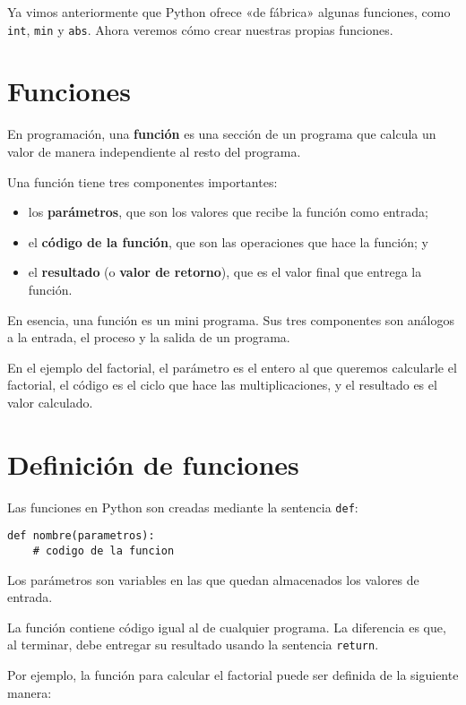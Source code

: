 Ya vimos anteriormente que Python ofrece «de fábrica» algunas funciones,
como \lstinline!int!, \lstinline!min! y \lstinline!abs!. Ahora veremos
cómo crear nuestras propias funciones.

\section{Funciones}

En programación, una \textbf{función} es una sección de un programa que
calcula un valor de manera independiente al resto del programa.

Una función tiene tres componentes importantes:

\begin{itemize}
\item
  los \textbf{parámetros}, que son los valores que recibe la función
  como entrada;
\item
  el \textbf{código de la función}, que son las operaciones que hace la
  función; y
\item
  el \textbf{resultado} (o \textbf{valor de retorno}), que es el valor
  final que entrega la función.
\end{itemize}

En esencia, una función es un mini programa. Sus tres componentes son
análogos a la entrada, el proceso y la salida de un programa.

En el ejemplo del factorial, el parámetro es el entero al que queremos
calcularle el factorial, el código es el ciclo que hace las
multiplicaciones, y el resultado es el valor calculado.

\section{Definición de funciones}

Las funciones en Python son creadas mediante la sentencia
\lstinline!def!:

\begin{lstlisting}
def nombre(parametros):
    # codigo de la funcion
\end{lstlisting}

Los parámetros son variables en las que quedan almacenados los valores
de entrada.

La función contiene código igual al de cualquier programa. La diferencia
es que, al terminar, debe entregar su resultado usando la sentencia
\lstinline!return!.

Por ejemplo, la función para calcular el factorial puede ser definida de
la siguiente manera:

